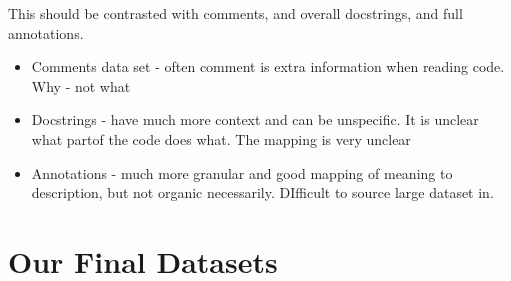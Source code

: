     This should be contrasted with comments, and overall docstrings, and full annotations.
    \begin{itemize}
        \item Comments data set - often comment is extra information when reading code. Why - not what
        \item Docstrings - have much more context and can be unspecific. It is unclear what partof the code does what. The mapping is very unclear
        \item Annotations - much more granular and good mapping of meaning to description, but not organic necessarily. DIfficult to source large dataset in.
    \end{itemize}


\section{Our Final Datasets} %
\label{sec:our_final_datasets}


